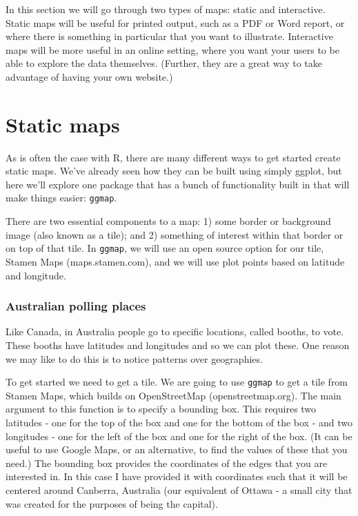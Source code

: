 \documentclass[
]{book}
\begin{document}
In this section we will go through two types of maps: static and interactive. Static maps will be useful for printed output, such as a PDF or Word report, or where there is something in particular that you want to illustrate. Interactive maps will be more useful in an online setting, where you want your users to be able to explore the data themselves. (Further, they are a great way to take advantage of having your own website.)

\hypertarget{static-maps}{%
\section{Static maps}\label{static-maps}}

As is often the case with R, there are many different ways to get started create static maps. We've already seen how they can be built using simply ggplot, but here we'll explore one package that has a bunch of functionality built in that will make things easier: \texttt{ggmap}.

There are two essential components to a map: 1) some border or background image (also known as a tile); and 2) something of interest within that border or on top of that tile. In \texttt{ggmap}, we will use an open source option for our tile, Stamen Maps (maps.stamen.com), and we will use plot points based on latitude and longitude.

\hypertarget{australian-polling-places}{%
\subsubsection{Australian polling places}\label{australian-polling-places}}

Like Canada, in Australia people go to specific locations, called booths, to vote. These booths have latitudes and longitudes and so we can plot these. One reason we may like to do this is to notice patterns over geographies.

To get started we need to get a tile. We are going to use \texttt{ggmap} to get a tile from Stamen Maps, which builds on OpenStreetMap (openstreetmap.org). The main argument to this function is to specify a bounding box. This requires two latitudes - one for the top of the box and one for the bottom of the box - and two longitudes - one for the left of the box and one for the right of the box. (It can be useful to use Google Maps, or an alternative, to find the values of these that you need.) The bounding box provides the coordinates of the edges that you are interested in. In this case I have provided it with coordinates such that it will be centered around Canberra, Australia (our equivalent of Ottawa - a small city that was created for the purposes of being the capital).
\end{document}
